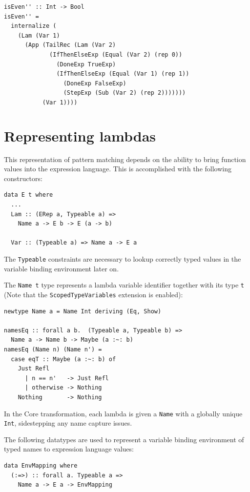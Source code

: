 \documentclass[runningheads, a4paper]{llncs}
\newcommand{\ttt}{\texttt}
\begin{document}

\begin{lstlisting}
isEven'' :: Int -> Bool
isEven'' =
  internalize (
    (Lam (Var 1)
      (App (TailRec (Lam (Var 2)
             (IfThenElseExp (Equal (Var 2) (rep 0))
               (DoneExp TrueExp)
               (IfThenElseExp (Equal (Var 1) (rep 1))
                 (DoneExp FalseExp)
                 (StepExp (Sub (Var 2) (rep 2)))))))
           (Var 1))))
\end{lstlisting}

\section{Representing lambdas}
\label{sec:LamRep}

This representation of pattern matching depends on the ability to bring
function values into the expression language. This is accomplished
with the following constructors:

\begin{lstlisting}
data E t where
  ...
  Lam :: (ERep a, Typeable a) =>
    Name a -> E b -> E (a -> b)

  Var :: (Typeable a) => Name a -> E a
\end{lstlisting}

The \ttt{Typeable} constraints are necessary to lookup correctly typed
values in the variable binding environment later on.

The \ttt{Name t} type represents a lambda variable identifier together with its
type \ttt{t} (Note that the \ttt{ScopedTypeVariables} extension is enabled):

\begin{lstlisting}
newtype Name a = Name Int deriving (Eq, Show)

namesEq :: forall a b.  (Typeable a, Typeable b) =>
  Name a -> Name b -> Maybe (a :~: b)
namesEq (Name n) (Name n') =
  case eqT :: Maybe (a :~: b) of
    Just Refl
      | n == n'   -> Just Refl
      | otherwise -> Nothing
    Nothing       -> Nothing
\end{lstlisting}

In the Core transformation, each lambda is given a \ttt{Name} with a globally
unique \ttt{Int}, sidestepping any name capture issues.

The following datatypes are used to represent a variable binding environment
of typed names to expression language values:

\begin{lstlisting}
data EnvMapping where
  (:=>) :: forall a. Typeable a =>
    Name a -> E a -> EnvMapping
\end{lstlisting}
\end{document}
